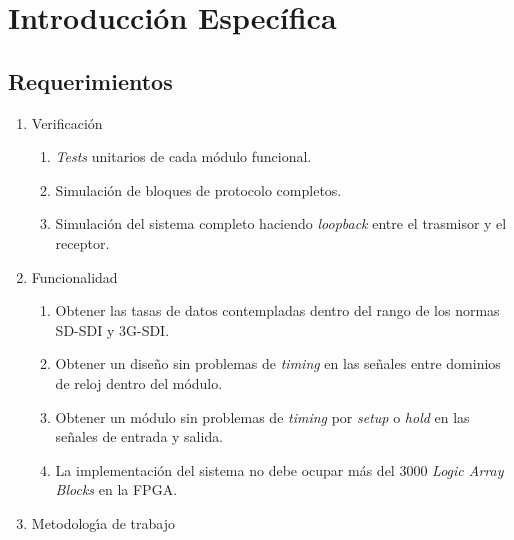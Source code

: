 \chapter{Introducción Específica}\label{Chapter2}

\section{Requerimientos}

\begin{enumerate}
    \item Verificación
    \begin{enumerate}
        \item \textit{Tests} unitarios de cada módulo funcional.
        \item Simulación de bloques de protocolo completos.
        \item Simulación del sistema completo haciendo \textit{loopback} entre el trasmisor y el receptor.
    \end{enumerate}
    \item Funcionalidad
    \begin{enumerate}
        \item Obtener las tasas de datos contempladas dentro del rango de los normas SD-SDI y 3G-SDI\@.
        \item Obtener un diseño sin problemas de \textit{timing} en las señales entre dominios de reloj
        dentro del módulo.
        \item Obtener un módulo sin problemas de \textit{timing} por \textit{setup} o \textit{hold} en las señales de entrada y salida.
        \item La implementación del sistema no debe ocupar más del 3000 \textit{Logic Array Blocks} en la FPGA\@.
    \end{enumerate}
    \item Metodologı́a de trabajo
    \begin{enumerate}

\end{enumerate}
\end{enumerate}
